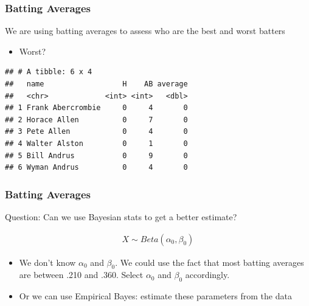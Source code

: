 \documentclass[
  shownotes,
  xcolor={svgnames},
  hyperref={colorlinks,citecolor=DarkBlue,linkcolor=DarkRed,urlcolor=DarkBlue}
  ]{beamer}
\begin{document}
\begin{frame}[fragile]
\frametitle{Batting Averages}

We are using batting averages to assess who are the best and worst batters

\begin{itemize}
  \item Worst?
\end{itemize}

\begin{small}
\begin{verbatim}
## # A tibble: 6 x 4
##   name                  H    AB average
##   <chr>             <int> <int>   <dbl>
## 1 Frank Abercrombie     0     4       0
## 2 Horace Allen          0     7       0
## 3 Pete Allen            0     4       0
## 4 Walter Alston         0     1       0
## 5 Bill Andrus           0     9       0
## 6 Wyman Andrus          0     4       0
\end{verbatim}
\end{small}

\end{frame}
\begin{frame}[fragile]
\frametitle{Batting Averages}

Question: Can we use Bayesian stats to get a better estimate?


\begin{align}
X \sim Beta(\alpha_0,\beta_0)
\end{align}

\begin{itemize}
  \item We don't know $\alpha_0$ and $\beta_0$. We could use the fact that most batting averages are between .210 and .360. Select $\alpha_0$ and $\beta_0$ accordingly.
  \item Or we can use Empirical Bayes: estimate these parameters from the data
\end{itemize}


\end{frame}
\end{document}
